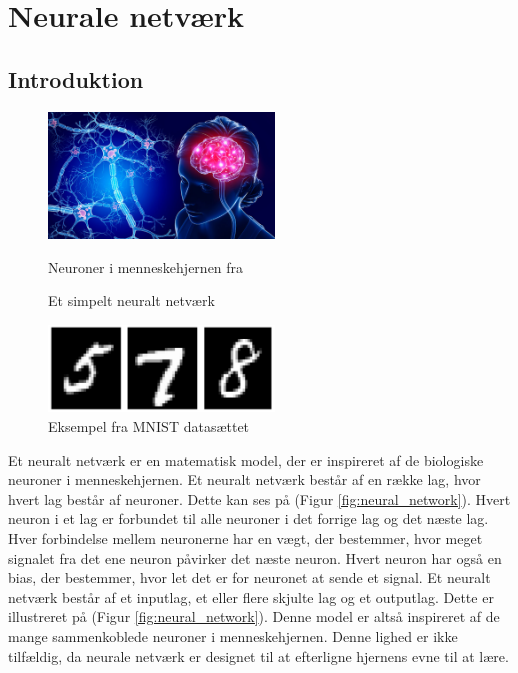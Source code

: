 \documentclass{article}
\newcommand{\figureref}[1]{(Figur \ref{#1})}
\begin{document}
\section{Neurale netværk}
\subsection{Introduktion}
\begin{figure}
  \vspace{-0.5cm}
  \includegraphics[width=6cm]{neurons.jpg}
  \vspace{-0.5cm}
  \caption{Neuroner i menneskehjernen fra \parencite{St_Clair_2021}}
  \label{fig:neurons}
  \vspace{0.5cm}
  
  \vspace{-0.5cm}
  \caption{Et simpelt neuralt netværk}
  \label{fig:neural_network}
  \vspace{0.5cm}
  \includegraphics[width=6cm]{mnist1.jpg}
  \vspace{-0.5cm}
  \caption{Eksempel fra MNIST datasættet \parencite{LeCun_1994}}
  \label{fig:mnist}
\end{figure}
Et neuralt netværk er en matematisk model, der er inspireret af de biologiske neuroner i menneskehjernen. Et neuralt netværk består af en række lag, hvor hvert lag består af neuroner. Dette kan ses på \figureref{fig:neural_network}. Hvert neuron i et lag er forbundet til alle neuroner i det forrige lag og det næste lag. Hver forbindelse mellem neuronerne har en vægt, der bestemmer, hvor meget signalet fra det ene neuron påvirker det næste neuron. Hvert neuron har også en bias, der bestemmer, hvor let det er for neuronet at sende et signal. Et neuralt netværk består af et \color{red!90}inputlag\color{black}, et eller flere \color{violet!90}skjulte lag\color{black} og et \color{blue!90}outputlag\color{black}. Dette er illustreret på \figureref{fig:neural_network}. Denne model er altså inspireret af de mange sammenkoblede neuroner i menneskehjernen. Denne lighed er ikke tilfældig, da neurale netværk er designet til at efterligne hjernens evne til at lære. \parencite{sanderson2017neural}\vspace{5mm}\\
\end{document}

